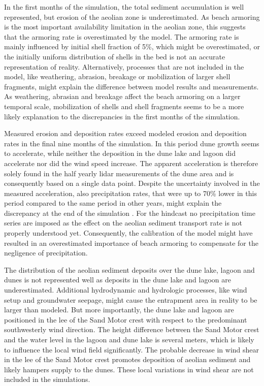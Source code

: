\documentclass[preprint,12pt,authoryear]{elsarticle}
\begin{document}
In the first months of the simulation, the total sediment accumulation
is well represented, but erosion of the aeolian zone is
underestimated. As beach armoring is the most important availability
limitation in the aeolian zone, this suggests that the armoring rate
is overestimated by the model. The armoring rate is mainly influenced
by initial shell fraction of 5\%, which might be overestimated, or the
initially uniform distribution of shells in the bed is not an accurate
representation of reality. Alternatively, processes that are not
included in the model, like weathering, abrasion, breakage or
mobilization of larger shell fragments, might explain the difference
between model results and measurements. As weathering, abrasian and
breakage affect the beach armoring on a larger temporal scale,
mobilization of shells and shell fragments seems to be a more likely
explanation to the discrepancies in the first months of the
simulation.

Measured erosion and deposition rates exceed modeled erosion and
deposition rates in the final nine months of the simulation. In this
period dune growth seems to accelerate, while neither the deposition
in the dune lake and lagoon did accelerate nor did the wind speed
increase. The apparent acceleration is therefore solely found in the
half yearly lidar measurements of the dune area \citep{Hoonhout2017a}
and is consequently based on a single data point. Despite the
uncertainty involved in the measured acceleration, also precipitation
rates, that were up to 70\% lower in this period compared to the same
period in other years, might explain the discrepancy at the end of the
simulation \citep{Jackson1998}. For the hindcast no precipitation time
series are imposed as the effect on the aeolian sediment transport
rate is not properly understood yet. Consequently, the calibration of
the model might have resulted in an overestimated importance of beach
armoring to compensate for the negligence of precipitation.

The distribution of the aeolian sediment deposits over the dune lake,
lagoon and dunes is not represented well as deposits in the dune lake
and lagoon are underestimated. Additional hydrodynamic and hydrologic
processes, like wind setup and groundwater seepage, might cause the
entrapment area in reality to be larger than modeled. But more
importantly, the dune lake and lagoon are positioned in the lee of the
Sand Motor crest with respect to the predominant southwesterly wind
direction. The height difference between the Sand Motor crest and the
water level in the lagoon and dune lake is several meters, which is
likely to influence the local wind field significantly. The probable
decrease in wind shear in the lee of the Sand Motor crest promotes
deposition of aeolian sediment and likely hampers supply to the
dunes. These local variations in wind shear are not included in the
simulations.
\end{document}

